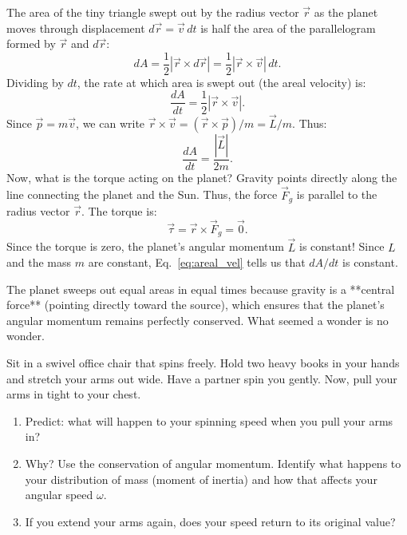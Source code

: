 The area of the tiny triangle swept out by the radius vector $\vec{r}$ as the planet moves through displacement $d\vec{r} = \vec{v}\,dt$ is half the area of the parallelogram formed by $\vec{r}$ and $d\vec{r}$:
\begin{equation}
    dA = \frac{1}{2} |\vec{r} \times d\vec{r}| = \frac{1}{2} |\vec{r} \times \vec{v}|\,dt.
\end{equation}
Dividing by $dt$, the rate at which area is swept out (the areal velocity) is:
\begin{equation}
    \frac{dA}{dt} = \frac{1}{2} |\vec{r} \times \vec{v}|.
\end{equation}
Since $\vec{p} = m\vec{v}$, we can write $\vec{r} \times \vec{v} = (\vec{r} \times \vec{p})/m = \vec{L}/m$. Thus:
\begin{equation}
    \frac{dA}{dt} = \frac{|\vec{L}|}{2m}. \label{eq:areal_vel}
\end{equation}
Now, what is the torque acting on the planet? Gravity points directly along the line connecting the planet and the Sun. Thus, the force $\vec{F}_g$ is parallel to the radius vector $\vec{r}$. The torque is:
\begin{equation}
    \vec{\tau} = \vec{r} \times \vec{F}_g = \vec{0}.
\end{equation}
Since the torque is zero, the planet's angular momentum $\vec{L}$ is constant! Since $L$ and the mass $m$ are constant, Eq.~\eqref{eq:areal_vel} tells us that $dA/dt$ is constant. 

The planet sweeps out equal areas in equal times because gravity is a **central force** (pointing directly toward the source), which ensures that the planet's angular momentum remains perfectly conserved. What seemed a wonder is no wonder.

\begin{whiteboard}
Sit in a swivel office chair that spins freely. Hold two heavy books in your hands and stretch your arms out wide. Have a partner spin you gently. Now, pull your arms in tight to your chest.
\begin{enumerate}[label=(\alph*), leftmargin=2.5em, itemsep=1pt]
  \item Predict: what will happen to your spinning speed when you pull your arms in?
  \item Why? Use the conservation of angular momentum. Identify what happens to your distribution of mass (moment of inertia) and how that affects your angular speed $\omega$.
  \item If you extend your arms again, does your speed return to its original value?
\end{enumerate}
\end{whiteboard}

